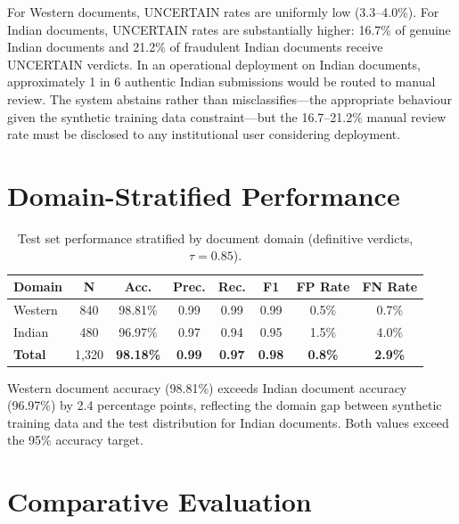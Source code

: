 \documentclass[12pt,a4paper,oneside]{report}
\begin{document}
For Western documents, UNCERTAIN rates are uniformly low (3.3--4.0\%). For Indian
documents, UNCERTAIN rates are substantially higher: 16.7\% of genuine Indian
documents and 21.2\% of fraudulent Indian documents receive UNCERTAIN verdicts.
In an operational deployment on Indian documents, approximately 1 in 6 authentic
Indian submissions would be routed to manual review. The system abstains rather
than misclassifies---the appropriate behaviour given the synthetic training data
constraint---but the 16.7--21.2\% manual review rate must be disclosed to any
institutional user considering deployment.

\section{Domain-Stratified Performance}
\label{sec:domain}

\begin{table}[H]
\centering
\caption{Test set performance stratified by document domain (definitive verdicts, $\tau=0.85$).}
\label{tab:domain_full}
\renewcommand{\arraystretch}{1.3}
\begin{tabular}{lccccccc}
\toprule
\textbf{Domain} & \textbf{N} & \textbf{Acc.} & \textbf{Prec.} & \textbf{Rec.} & \textbf{F1} & \textbf{FP Rate} & \textbf{FN Rate} \\
\midrule
Western        & 840  & 98.81\% & 0.99 & 0.99 & 0.99 & 0.5\% & 0.7\% \\
Indian         & 480  & 96.97\% & 0.97 & 0.94 & 0.95 & 1.5\% & 4.0\% \\
\midrule
\textbf{Total} & 1,320 & \textbf{98.18\%} & \textbf{0.99} & \textbf{0.97} & \textbf{0.98} & \textbf{0.8\%} & \textbf{2.9\%} \\
\bottomrule
\end{tabular}
\end{table}

Western document accuracy (98.81\%) exceeds Indian document accuracy (96.97\%)
by 2.4 percentage points, reflecting the domain gap between synthetic training
data and the test distribution for Indian documents. Both values exceed the 95\%
accuracy target.

\section{Comparative Evaluation}
\label{sec:comparison}
\end{document}
